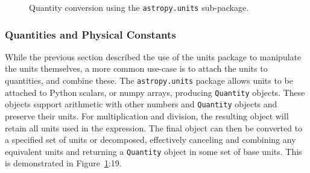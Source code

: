 \documentclass[traditabstract]{aa}
\begin{document}
\begin{figure}
\caption{Quantity conversion using the \texttt{astropy.units} sub-package.\label{code:quantities}}
\end{figure}

\subsubsection{Quantities and Physical Constants}

\label{sec:quantities}

While the previous section described the use of the units package to
manipulate the units themselves, a more common use-case is to attach
the units to quantities, and combine these. The \texttt{astropy.units}
package allows units to be attached to Python scalars, or \gls{numpy}
arrays, producing \texttt{Quantity} objects. These objects support
arithmetic with other numbers and \texttt{Quantity} objects and
preserve their units. For multiplication and division, the resulting
object will retain all units used in the expression.  The final object
can then be converted to a specified set of units or decomposed,
effectively canceling and combining any equivalent units and returning
a \texttt{Quantity} object in some set of base units. This is
demonstrated in Figure~\ref{code:quantities}:19.
\end{document}

